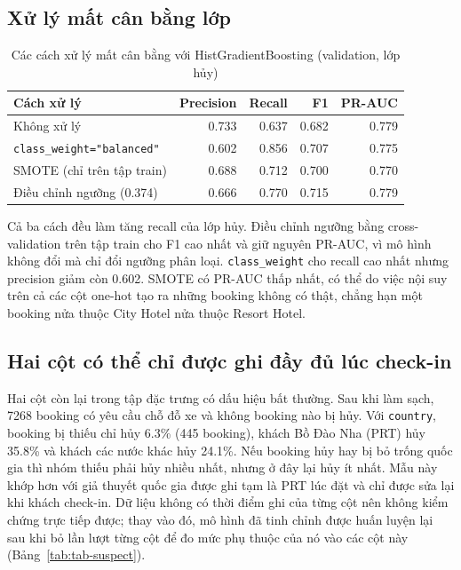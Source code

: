 \subsection{Xử lý mất cân bằng lớp}
\begin{table}[H]
\centering
\caption{Các cách xử lý mất cân bằng với HistGradientBoosting (validation, lớp hủy)}
\label{tab:tab-imbalance}
\begin{tabular}{lrrrr}
\toprule
Cách xử lý & Precision & Recall & F1 & PR-AUC\\
\midrule
Không xử lý & 0.733 & 0.637 & 0.682 & 0.779\\
\texttt{class\_weight="balanced"} & 0.602 & 0.856 & 0.707 & 0.775\\
SMOTE (chỉ trên tập train) & 0.688 & 0.712 & 0.700 & 0.770\\
Điều chỉnh ngưỡng (0.374) & 0.666 & 0.770 & 0.715 & 0.779\\
\bottomrule
\end{tabular}
\end{table}

Cả ba cách đều làm tăng recall của lớp hủy. Điều chỉnh ngưỡng bằng cross-validation trên tập train cho F1 cao nhất và giữ nguyên PR-AUC,
vì mô hình không đổi mà chỉ đổi ngưỡng phân loại. \texttt{class\_weight} cho recall cao nhất nhưng precision giảm còn 0.602.
SMOTE có PR-AUC thấp nhất, có thể do việc nội suy trên cả các cột one-hot tạo ra những booking không có thật,
chẳng hạn một booking nửa thuộc City Hotel nửa thuộc Resort Hotel.

\subsection{Hai cột có thể chỉ được ghi đầy đủ lúc check-in}
\label{sec:tab-suspect}
Hai cột còn lại trong tập đặc trưng có dấu hiệu bất thường. Sau khi làm sạch, 7268 booking có yêu cầu chỗ đỗ xe và không booking nào bị hủy.
Với \texttt{country}, booking bị thiếu chỉ hủy 6.3\% (445 booking), khách Bồ Đào Nha (PRT) hủy 35.8\% và khách các nước khác hủy 24.1\%.
Nếu booking hủy hay bị bỏ trống quốc gia thì nhóm thiếu phải hủy nhiều nhất, nhưng ở đây lại hủy ít nhất. Mẫu này khớp hơn với
giả thuyết quốc gia được ghi tạm là PRT lúc đặt và chỉ được sửa lại khi khách check-in. Dữ liệu không có thời điểm ghi của từng cột
nên không kiểm chứng trực tiếp được; thay vào đó, mô hình đã tinh chỉnh được huấn luyện lại sau khi bỏ lần lượt từng cột
để đo mức phụ thuộc của nó vào các cột này (Bảng~\ref{tab:tab-suspect}).

